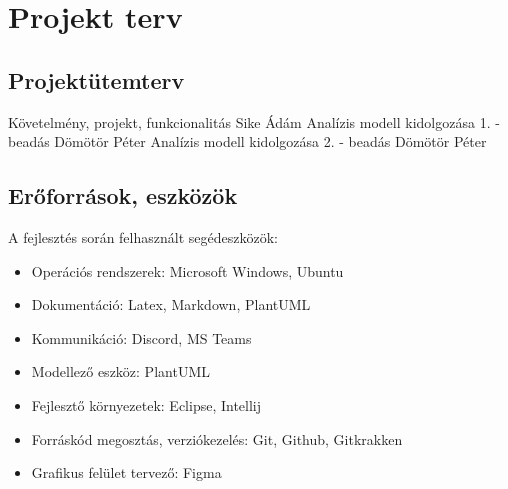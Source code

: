 \documentclass[../../projlab]{subfiles}
\begin{document}
\section{Projekt terv}


\subsection{Projektütemterv}

\begin{center}
	\begin{terv_v2}
			  {Követelmény, projekt, funkcionalitás}{ Sike Ádám }
			 { Analízis modell kidolgozása 1. - beadás }{ Dömötör Péter } 
			 { Analízis modell kidolgozása 2. - beadás }{ Dömötör Péter }
	\end{terv_v2}
\end{center}

\subsection{Erőforrások, eszközök}
A fejlesztés során felhasznált segédeszközök:
\begin{itemize}
	\item Operációs rendszerek: Microsoft Windows, Ubuntu
	\item Dokumentáció: Latex, Markdown, PlantUML
	\item Kommunikáció: Discord, MS Teams
	\item Modellező eszköz: PlantUML
	\item Fejlesztő környezetek: Eclipse, Intellij
	\item Forráskód megosztás, verziókezelés: Git, Github, Gitkrakken
	\item Grafikus felület tervező: Figma
\end{itemize}
\end{document}
